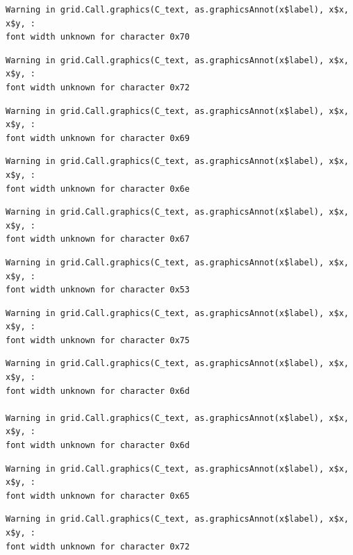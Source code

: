 \documentclass[
  letterpaper,
  DIV=11,
  numbers=noendperiod]{scrreprt}
\begin{document}
\begin{verbatim}
Warning in grid.Call.graphics(C_text, as.graphicsAnnot(x$label), x$x, x$y, :
font width unknown for character 0x70
\end{verbatim}

\begin{verbatim}
Warning in grid.Call.graphics(C_text, as.graphicsAnnot(x$label), x$x, x$y, :
font width unknown for character 0x72
\end{verbatim}

\begin{verbatim}
Warning in grid.Call.graphics(C_text, as.graphicsAnnot(x$label), x$x, x$y, :
font width unknown for character 0x69
\end{verbatim}

\begin{verbatim}
Warning in grid.Call.graphics(C_text, as.graphicsAnnot(x$label), x$x, x$y, :
font width unknown for character 0x6e
\end{verbatim}

\begin{verbatim}
Warning in grid.Call.graphics(C_text, as.graphicsAnnot(x$label), x$x, x$y, :
font width unknown for character 0x67
\end{verbatim}

\begin{verbatim}
Warning in grid.Call.graphics(C_text, as.graphicsAnnot(x$label), x$x, x$y, :
font width unknown for character 0x53
\end{verbatim}

\begin{verbatim}
Warning in grid.Call.graphics(C_text, as.graphicsAnnot(x$label), x$x, x$y, :
font width unknown for character 0x75
\end{verbatim}

\begin{verbatim}
Warning in grid.Call.graphics(C_text, as.graphicsAnnot(x$label), x$x, x$y, :
font width unknown for character 0x6d

Warning in grid.Call.graphics(C_text, as.graphicsAnnot(x$label), x$x, x$y, :
font width unknown for character 0x6d
\end{verbatim}

\begin{verbatim}
Warning in grid.Call.graphics(C_text, as.graphicsAnnot(x$label), x$x, x$y, :
font width unknown for character 0x65
\end{verbatim}

\begin{verbatim}
Warning in grid.Call.graphics(C_text, as.graphicsAnnot(x$label), x$x, x$y, :
font width unknown for character 0x72
\end{verbatim}
\end{document}
